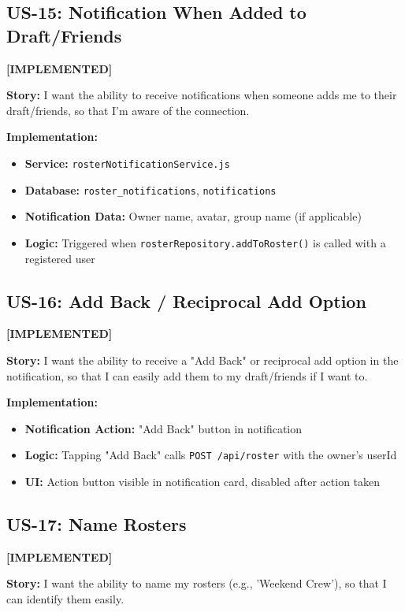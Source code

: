 \documentclass[11pt,a4paper]{article}
\newcommand{\implemented}{\textcolor{implemented}{\textbf{[IMPLEMENTED]}}}
\begin{document}
\subsection{US-15: Notification When Added to Draft/Friends}
\implemented

\textbf{Story:} I want the ability to receive notifications when someone adds me to their draft/friends, so that I'm aware of the connection.

\textbf{Implementation:}
\begin{itemize}[leftmargin=*]
  \item \textbf{Service:} \texttt{rosterNotificationService.js}
  \item \textbf{Database:} \texttt{roster\_notifications}, \texttt{notifications}
  \item \textbf{Notification Data:} Owner name, avatar, group name (if applicable)
  \item \textbf{Logic:} Triggered when \texttt{rosterRepository.addToRoster()} is called with a registered user
\end{itemize}

\subsection{US-16: Add Back / Reciprocal Add Option}
\implemented

\textbf{Story:} I want the ability to receive a "Add Back" or reciprocal add option in the notification, so that I can easily add them to my draft/friends if I want to.

\textbf{Implementation:}
\begin{itemize}[leftmargin=*]
  \item \textbf{Notification Action:} "Add Back" button in notification
  \item \textbf{Logic:} Tapping "Add Back" calls \texttt{POST /api/roster} with the owner's userId
  \item \textbf{UI:} Action button visible in notification card, disabled after action taken
\end{itemize}

\subsection{US-17: Name Rosters}
\implemented

\textbf{Story:} I want the ability to name my rosters (e.g., 'Weekend Crew'), so that I can identify them easily.
\end{document}
